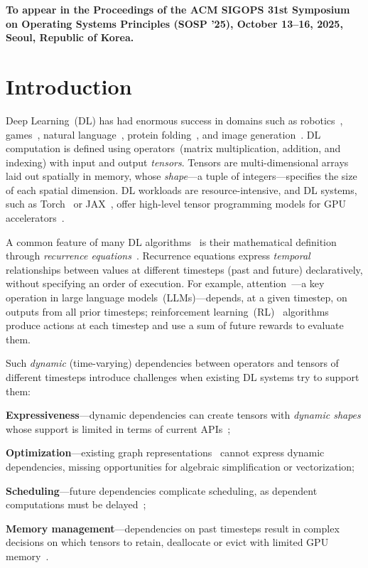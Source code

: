 
\vfill{}
\noindent\textbf{To appear in the Proceedings of the ACM SIGOPS 31st Symposium on Operating Systems Principles (SOSP ’25), October 13–16, 2025, Seoul, Republic of Korea.}

\section{Introduction}

Deep Learning~(DL) has had enormous success in domains such as robotics~\cite{hwangbo2019learning}, games~\cite{silver2017mastering}, natural language~\cite{brown2020language}, protein folding~\cite{jumper2021highly}, and image generation~\cite{rombach2022high}. DL computation is defined using operators~(\eg matrix multiplication, addition, and indexing) with input and output \emph{tensors}. Tensors are multi-dimensional arrays laid out spatially in memory, whose \emph{shape}---a tuple of integers---specifies the size of each spatial dimension. DL workloads are resource-intensive, and DL systems, such as Torch~\cite{paszke2019pytorch} or JAX~\cite{frostig2018compiling}, offer high-level tensor programming models for GPU accelerators~\cite{raina2009large}. 

A common feature of many DL algorithms~\cite{vaswani2017attention, sutton2018reinforcement, rumelhart1986learning, rombach2022high, gu2021efficiently} is their mathematical definition through \emph{recurrence equations}~\cite{karp1967organization}. Recurrence equations express \emph{temporal} relationships between values at different timesteps (past and future) declaratively, \ie without specifying an order of execution. For example, attention~\cite{vaswani2017attention}---a key operation in large language models~(LLMs)---depends, at a given timestep, on outputs from all prior timesteps; reinforcement learning~(RL)~\cite{sutton1988learning, williams1992simple} algorithms produce actions at each timestep and use a sum of future rewards to evaluate them.


Such \emph{dynamic} (\ie time-varying) dependencies between operators and tensors of different timesteps  introduce challenges when existing DL systems try to support them:
%
\begin{myitemize}
  \item \textbf{Expressiveness}---dynamic dependencies can create tensors with \emph{dynamic shapes} whose support is limited in terms of current APIs~\cite{ansel2024pytorch,lai2025relax}; 
  \item \textbf{Optimization}---existing graph representations~\cite{abadi2016tensorflow, frostig2018compiling} cannot express dynamic dependencies, missing opportunities for algebraic simplification or vectorization;  
  \item \textbf{Scheduling}---future dependencies complicate scheduling, as dependent computations must be delayed~\cite{karp1967organization, moritz2018ray};
  \item \textbf{Memory management}---dependencies on past timesteps result in complex decisions on which tensors to retain, deallocate or evict with limited GPU memory~\cite{rhu2016vdnn}.
\end{myitemize}

